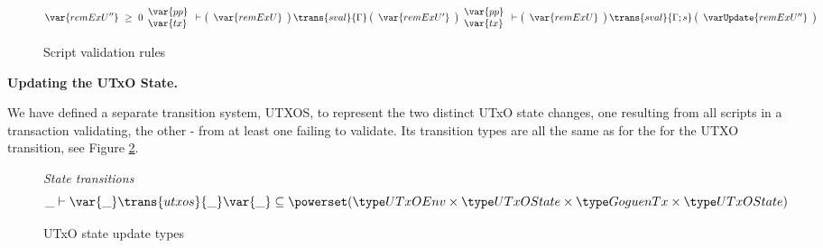 \begin{figure}[htb]
\begin{equation}
{    \\
    ~
    \\
    \var{remExU''}~\geq~0
    \\
    ~
    \\
    {
    \begin{array}{l}
      \var{pp}\\
      \var{tx}\\
    \end{array}
    }
      \vdash
      \left(
      {
      \begin{array}{r}
        \var{remExU}\\
      \end{array}
      }
      \right)
      \trans{sval}{\Gamma}
      \left(
      {
      \begin{array}{r}
        \var{remExU'}\\
      \end{array}
      }
      \right)
    }
    {
    \begin{array}{l}
      \var{pp}\\
      \var{tx}\\
    \end{array}
      \vdash
      \left(
      \begin{array}{r}
        \var{remExU}\\
      \end{array}
      \right)
      \trans{sval}{\Gamma;s}
      \left(
      \begin{array}{r}
        \varUpdate{remExU''}\\
      \end{array}
      \right)
    }
  \end{equation}
  \caption{Script validation rules}
  \label{fig:rules:utxo-scrval}
\end{figure}


\textbf{Updating the UTxO State.}

We have defined a separate transition system, UTXOS, to represent the two distinct
UTxO state changes, one resulting from all scripts in a transaction validating,
the other - from at least one failing to validate. Its transition types
are all the same as for the for the UTXO transition, see Figure
\ref{fig:ts-types:utxo-scripts}.

\begin{figure}[htb]
  \emph{State transitions}
  \begin{equation*}
    \_ \vdash
    \var{\_} \trans{utxos}{\_} \var{\_}
    \subseteq \powerset (\UTxOEnv \times \UTxOState \times \GoguenTx \times \UTxOState)
  \end{equation*}
  \caption{UTxO state update types}
  \label{fig:ts-types:utxo-scripts}
\end{figure}

